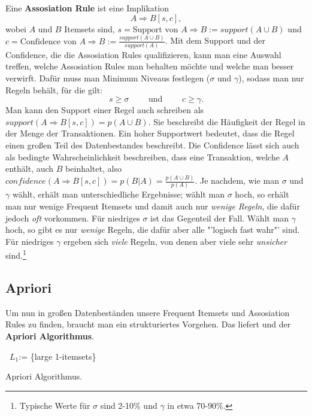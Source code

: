 Eine \textbf{Assosiation Rule} ist eine Implikation \[A\Rightarrow B[s,c],\] wobei
\(A\) und \(B\) Itemsets sind, \(s = \text{Support von } A \Rightarrow B 
:= support(A\cup B)\) und 
\(c = \text{Confidence von } A \Rightarrow B := \frac{support(A\cup B)}{support(A)}\).
Mit dem Support und der Confidence, die die Assosiation Rules qualifizieren, kann 
man eine Auswahl treffen, welche Assosiation Rules man behalten möchte und welche
man besser verwirft. Dafür muss man Minimum Niveaus festlegen (\(\sigma\) und \(\gamma\)),
sodass man nur Regeln behält, für die gilt:
\[
	s \geq \sigma \qquad \text{ und } \qquad c \geq \gamma.
\]
Man kann den Support einer Regel auch schreiben als \(support(A\Rightarrow B [s,c])
= p(A\cup B)\). Sie beschreibt die Häufigkeit der Regel in der Menge der
Transaktionen. Ein hoher Supportwert bedeutet, dass die Regel einen großen Teil
des Datenbestandes beschreibt. Die Confidence lässt sich auch als bedingte
Wahrscheinlichkeit beschreiben, dass eine Transaktion, welche \(A\) enthält, auch \(B\)
beinhaltet, also \(confidence(A\Rightarrow B[s,c]) = p(B|A) = \frac{p(A\cup B)}
{p(A)}\). Je nachdem, wie man \(\sigma\) und \(\gamma\) wählt, erhält man
unterschiedliche Ergebnisse; wählt man \(\sigma\) hoch, so erhält man nur wenige
Frequent Itemsets und damit auch nur \textit{wenige Regeln}, die dafür jedoch
\textit{oft} vorkommen. Für niedriges \(\sigma\) ist das Gegenteil der Fall.
Wählt man \(\gamma\) hoch, so gibt es nur \textit{wenige} Regeln, die dafür
aber alle "'logisch fast wahr"' sind. Für niedriges \(\gamma\) ergeben sich 
\textit{viele} Regeln, von denen aber viele sehr \textit{unsicher} sind.\footnote{
Typische Werte für \(\sigma\) sind 2-10\% und \(\gamma\) in etwa 70-90\%.}


\subsection{Apriori}
Um nun in großen Datenbeständen unsere Frequent Itemsets und Assosiation Rules
zu finden, braucht man ein strukturiertes Vorgehen. Das liefert und der
\textbf{Apriori Algorithmus}.

\begin{algorithm}[tbh]
	\SetAlgoLined
	\DontPrintSemicolon
	\BlankLine
	\ {\(L_1\):= \{large 1-itemsets\}}\;
	\;
	\caption{Apriori Algorithmus.}
	\label{alg:apriori}
\end{algorithm}

